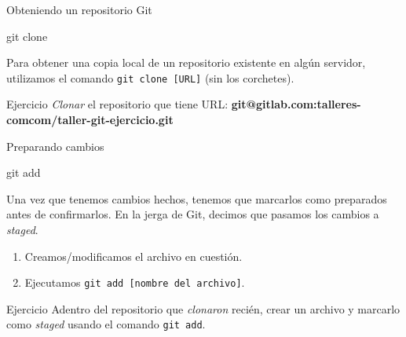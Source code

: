 \begin{frame}[t]{Obteniendo un repositorio Git}

    \begin{comando}
        git clone
    \end{comando}

    \pause
	\begin{block}{}
        Para obtener una copia local de un repositorio existente en algún servidor,
        utilizamos el comando \texttt{git clone [URL]} (sin los corchetes).
    \end{block}

    \pause
    \vspace{1em}
    \begin{ejercicio}{Ejercicio}
        \textit{Clonar} el repositorio que tiene URL: \textbf{git@gitlab.com:talleres-comcom/taller-git-ejercicio.git}
    \end{ejercicio}
\end{frame}

\begin{frame}[t]{Preparando cambios}
    \begin{comando}
        git add
    \end{comando}

    \pause
    \begin{block}{}
        Una vez que tenemos cambios hechos, tenemos que marcarlos como preparados antes de confirmarlos. En la jerga de Git, decimos que pasamos los cambios a \textit{staged}.
        \begin{enumerate}
            \item Creamos/modificamos el archivo en cuestión.
            \item Ejecutamos \texttt{git add [nombre del archivo]}.
        \end{enumerate}
    \end{block}

    \pause
    \vspace{1em}
    \begin{ejercicio}{Ejercicio}
        Adentro del repositorio que \textit{clonaron} recién, crear un archivo y
        marcarlo como \textit{staged} usando el comando \texttt{git add}.
    \end{ejercicio}
\end{frame}

